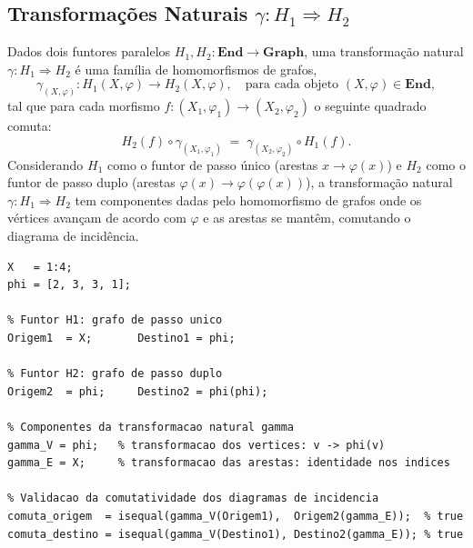 \subsection{Transformações Naturais \texorpdfstring{$\gamma: H_1 \Rightarrow H_2$}{gamma: H1 => H2}}

Dados dois funtores paralelos $H_1, H_2: \mathbf{End} \to \mathbf{Graph}$, uma transformação natural $\gamma: H_1 \Rightarrow H_2$ é uma família de homomorfismos de grafos,
\[
    \gamma_{(X,\varphi)} : H_1(X, \varphi) \to H_2(X, \varphi), \quad \text{para cada objeto } (X,\varphi) \in \mathbf{End},
\]
tal que para cada morfismo $f: (X_1, \varphi_1) \to (X_2, \varphi_2)$ o seguinte quadrado comuta:
\[
    H_2(f) \circ \gamma_{(X_1,\varphi_1)} \;=\; \gamma_{(X_2,\varphi_2)} \circ H_1(f).
\]
Considerando $H_1$ como o funtor de passo único (arestas $x \to \varphi(x)$) e $H_2$ como o funtor de passo duplo (arestas $\varphi(x) \to \varphi(\varphi(x))$), a transformação natural $\gamma: H_1 \Rightarrow H_2$ tem componentes dadas pelo homomorfismo de grafos onde os vértices avançam de acordo com $\varphi$ e as arestas se mantêm, comutando o diagrama de incidência.

\begin{lstlisting}[style=matlab, caption={Verificação da transformação natural $\gamma: H_1 \Rightarrow H_2$ em $\mathbf{End} \to \mathbf{Graph}$}]
X   = 1:4;
phi = [2, 3, 3, 1];

% Funtor H1: grafo de passo unico
Origem1  = X;       Destino1 = phi;

% Funtor H2: grafo de passo duplo
Origem2  = phi;     Destino2 = phi(phi);

% Componentes da transformacao natural gamma
gamma_V = phi;   % transformacao dos vertices: v -> phi(v)
gamma_E = X;     % transformacao das arestas: identidade nos indices

% Validacao da comutatividade dos diagramas de incidencia
comuta_origem  = isequal(gamma_V(Origem1),  Origem2(gamma_E));  % true
comuta_destino = isequal(gamma_V(Destino1), Destino2(gamma_E)); % true
\end{lstlisting}